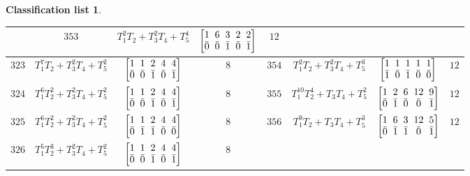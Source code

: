 \documentclass[pdftex]{sigma}%
\theoremstyle{definition}
\newtheorem{class-list}[thm]{Classification list}
\numberwithin{equation}{section}
\begin{document}
\begin{class-list}
\begin{table}[h!]
\begin{tabu}{c|c|c|c||c|c|c|c}
&${353}$&${T_{1}^{2}T_{2}+T_{3}^{2}T_{4}+T_{5}^{4}}$
&$\arraycolsep=1mm\begin{bmatrix}{1} & {6} & {3} & {2} & {2} \\ {\bar{0}} & {\bar{0}} & {\bar{1}} & {\bar{0}} & {\bar{1}}\end{bmatrix}$&${12}$
\\
\hline
${323}$&${T_{1}^{7}T_{2}+T_{3}^{2}T_{4}+T_{5}^{2}}$
&$\arraycolsep=1mm\begin{bmatrix}{1} & {1} & {2} & {4} & {4} \\ {\bar{0}} & {\bar{0}} & {\bar{1}} & {\bar{0}} & {\bar{1}}\end{bmatrix}$&${8}$
&${354}$&${T_{1}^{2}T_{2}+T_{3}^{2}T_{4}+T_{5}^{3}}$
&$\arraycolsep=1mm\begin{bmatrix}{1} & {1} & {1} & {1} & {1} \\ {\bar{1}} & {\bar{0}} & {\bar{1}} & {\bar{0}} & {\bar{0}}\end{bmatrix}$&${12}$
\\
\hline
${324}$&${T_{1}^{6}T_{2}^{2}+T_{3}^{2}T_{4}+T_{5}^{2}}$
&$\arraycolsep=1mm\begin{bmatrix}{1} & {1} & {2} & {4} & {4} \\ {\bar{0}} & {\bar{0}} & {\bar{1}} & {\bar{0}} & {\bar{1}}\end{bmatrix}$&${8}$
&${355}$&${T_{1}^{10}T_{2}^{4}+T_{3}T_{4}+T_{5}^{2}}$
&$\arraycolsep=1mm\begin{bmatrix}{1} & {2} & {6} & {12} & {9} \\ {\bar{0}} & {\bar{1}} & {\bar{0}} & {\bar{0}} & {\bar{1}}\end{bmatrix}$&${12}$
\\
\hline
${325}$&${T_{1}^{6}T_{2}^{2}+T_{3}^{2}T_{4}+T_{5}^{2}}$
&$\arraycolsep=1mm\begin{bmatrix}{1} & {1} & {2} & {4} & {4} \\ {\bar{0}} & {\bar{1}} & {\bar{1}} & {\bar{0}} & {\bar{0}}\end{bmatrix}$&${8}$
&${356}$&${T_{1}^{9}T_{2}+T_{3}T_{4}+T_{5}^{3}}$
&$\arraycolsep=1mm\begin{bmatrix}{1} & {6} & {3} & {12} & {5} \\ {\bar{0}} & {\bar{1}} & {\bar{1}} & {\bar{0}} & {\bar{1}}\end{bmatrix}$&${12}$
\\
\hline
${326}$&${T_{1}^{5}T_{2}^{3}+T_{3}^{2}T_{4}+T_{5}^{2}}$
&$\arraycolsep=1mm\begin{bmatrix}{1} & {1} & {2} & {4} & {4} \\ {\bar{0}} & {\bar{0}} & {\bar{1}} & {\bar{0}} & {\bar{1}}\end{bmatrix}$&${8}$

\end{tabu}
\end{table}
\end{class-list}
\end{document}
